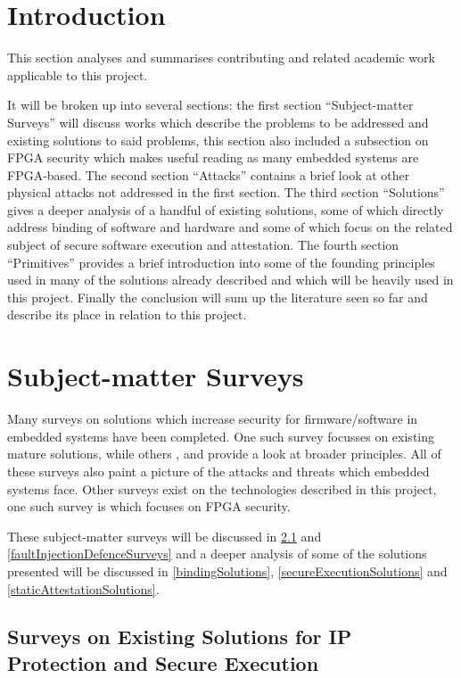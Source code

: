 \section{Introduction}\label{litIntroduction}

This section analyses and summarises contributing and related academic work applicable to this project.

It will be broken up into several sections: the first section ``Subject-matter Surveys'' will discuss works which describe the problems to be addressed and existing solutions to said problems, this section also included a subsection on FPGA security which makes useful reading as many embedded systems are FPGA-based. The second section ``Attacks'' contains a brief look at other physical attacks not addressed in the first section. The third section ``Solutions'' gives a deeper analysis of a handful of existing solutions, some of which directly address binding of software and hardware and some of which focus on the related subject of secure software execution and attestation. The fourth section ``Primitives'' provides a brief introduction into some of the founding principles used in many of the solutions already described and which will be heavily used in this project. Finally the conclusion will sum up the literature seen so far and describe its place in relation to this project.

\section{Subject-matter Surveys}\label{subjectMatterSurveys}

Many surveys on solutions which increase security for firmware/software in embedded systems have been completed. One such survey \cite{Shepherd2016} focusses on existing mature solutions, while others \cite{Bryant2004}, \cite{Collberg2002} and \cite{Theissing2013} provide a look at broader principles. All of these surveys also paint a picture of the attacks and threats which embedded systems face. Other surveys exist on the technologies described in this project, one such survey is \cite{Drimer2008} which focuses on FPGA security.

These subject-matter surveys will be discussed in \ref{solutionSurveys} and \ref{faultInjectionDefenceSurveys} and a deeper analysis of some of the solutions presented will be discussed in \ref{bindingSolutions}, \ref{secureExecutionSolutions} and \ref{staticAttestationSolutions}.


\subsection{Surveys on Existing Solutions for IP Protection and Secure Execution}\label{solutionSurveys}

